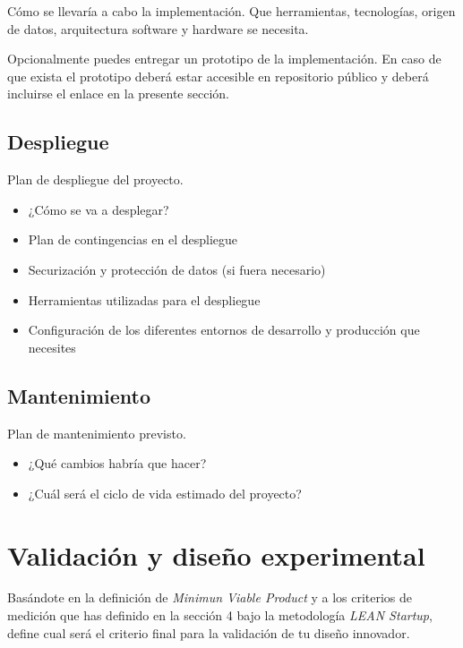 \documentclass[12pt,a4paper]{articuloAPA}
\begin{document}
Cómo se llevaría a cabo la implementación. Que herramientas, tecnologías, origen de datos, arquitectura software y hardware se necesita.

\begin{quotebox}
  Opcionalmente puedes entregar un prototipo de la implementación. En caso de que exista el prototipo deberá estar accesible en repositorio público y deberá incluirse el enlace en la presente sección.
\end{quotebox}

\subsection{Despliegue}

Plan de despliegue del proyecto. 

\begin{itemize}
  \item ¿Cómo se va a desplegar?
  \item Plan de contingencias en el despliegue
  \item Securización y protección de datos (si fuera necesario)
  \item Herramientas utilizadas para el despliegue
  \item Configuración de los diferentes entornos de desarrollo y producción que necesites
\end{itemize}

\subsection{Mantenimiento}

Plan de mantenimiento previsto. 

\begin{itemize}
  \item ¿Qué cambios habría que hacer?
  \item ¿Cuál será el ciclo de vida estimado del proyecto?  
\end{itemize}


\section{Validación y diseño experimental}

Basándote en la definición de \textit{Minimun Viable Product} y a los criterios de medición que has definido en la sección 4 bajo la metodología \textit{LEAN Startup}, define cual será el criterio final para la validación de tu diseño innovador. 
\end{document}
